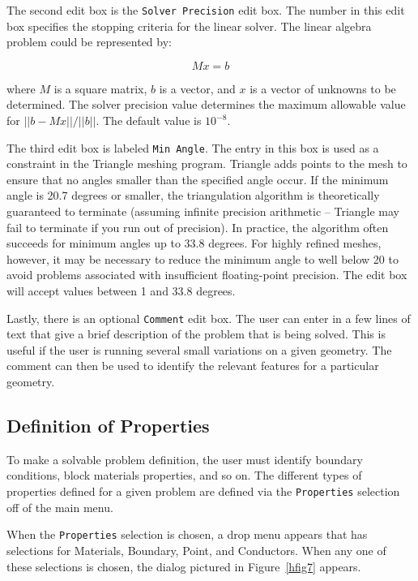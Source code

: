 The second edit box is the \texttt{Solver Precision} edit box. The
number in this edit box specifies the stopping criteria for the
linear solver. The linear algebra problem could be represented by:

\begin{equation}
M x = b
\end{equation}

\noindent
where $M$ is a square matrix, $b$ is a vector, and $x$ is a vector of
unknowns to be determined. The solver precision value determines the maximum
allowable value for $\vert \vert b - Mx\vert \vert / \vert \vert b\vert
\vert $. The default value is $10^{ - 8}$.

The third edit box is labeled {\tt Min Angle}.  The entry in this box is used as a
constraint in the Triangle meshing program.  Triangle adds points to the mesh to
ensure that no angles smaller than the specified angle occur. If the minimum angle
is 20.7 degrees or smaller, the triangulation algorithm is theoretically guaranteed to
terminate (assuming infinite precision arithmetic -- Triangle may
fail to terminate if you run out of precision).  In practice, the
algorithm often succeeds for minimum angles up to 33.8 degrees.
For highly refined meshes, however, it may be necessary to reduce
the minimum angle to well below 20 to avoid problems associated
with insufficient floating-point precision.  The edit box will accept
values between 1 and 33.8 degrees.

Lastly, there is an optional \texttt{Comment} edit box. The user
can enter in a few lines of text that give a brief description of
the problem that is being solved. This is useful if the user is
running several small variations on a given geometry. The comment
can then be used to identify the relevant features for a particular
geometry.

\subsection{Definition of Properties}

To make a solvable problem definition, the user must identify boundary
conditions, block materials properties, and so on. The different types of
properties defined for a given problem are defined via the
\texttt{Properties} selection off of the main menu.

When the \texttt{Properties} selection is chosen, a drop menu
appears that has selections for Materials, Boundary, Point, and
Conductors. When any one of these selections is chosen, the dialog
pictured in Figure~\ref{hfig7} appears.

